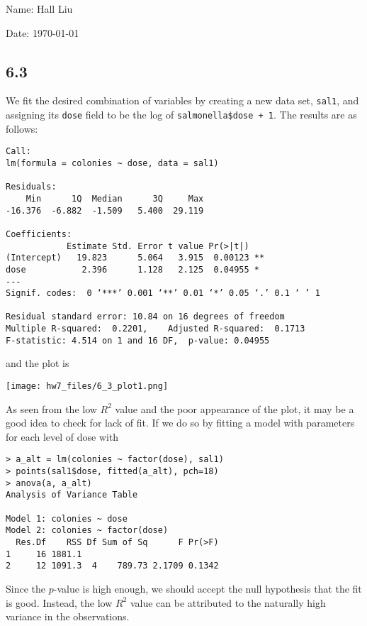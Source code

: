 \documentclass{article}
\begin{document}
Name: Hall Liu

Date: \today 
\vspace{1.5cm}

\subsection*{6.3}
We fit the desired combination of variables by creating a new data set, \verb|sal1|, and assigning its \verb|dose| field to be the log of \verb|salmonella$dose + 1|. The results are as follows:
\begin{verbatim}
Call:
lm(formula = colonies ~ dose, data = sal1)

Residuals:
    Min      1Q  Median      3Q     Max 
-16.376  -6.882  -1.509   5.400  29.119 

Coefficients:
            Estimate Std. Error t value Pr(>|t|)   
(Intercept)   19.823      5.064   3.915  0.00123 **
dose           2.396      1.128   2.125  0.04955 * 
---
Signif. codes:  0 ‘***’ 0.001 ‘**’ 0.01 ‘*’ 0.05 ‘.’ 0.1 ‘ ’ 1

Residual standard error: 10.84 on 16 degrees of freedom
Multiple R-squared:  0.2201,    Adjusted R-squared:  0.1713 
F-statistic: 4.514 on 1 and 16 DF,  p-value: 0.04955
\end{verbatim}
and the plot is

\texttt{[image: hw7\_files/6\_3\_plot1.png]}

As seen from the low $R^2$ value and the poor appearance of the plot, it may be a good idea to check for lack of fit. If we do so by fitting a model with parameters for each level of dose with
\begin{verbatim}
> a_alt = lm(colonies ~ factor(dose), sal1)
> points(sal1$dose, fitted(a_alt), pch=18)
> anova(a, a_alt)
Analysis of Variance Table

Model 1: colonies ~ dose
Model 2: colonies ~ factor(dose)
  Res.Df    RSS Df Sum of Sq      F Pr(>F)
1     16 1881.1                           
2     12 1091.3  4    789.73 2.1709 0.1342
\end{verbatim}
Since the $p$-value is high enough, we should accept the null hypothesis that the fit is good. Instead, the low $R^2$ value can be attributed to the naturally high variance in the observations.
\end{document}
